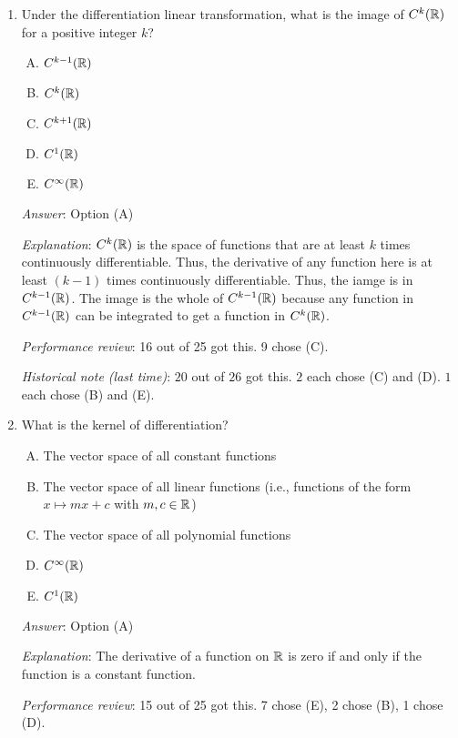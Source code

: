 \documentclass[10pt]{amsart}
\begin{document}
\begin{enumerate}
  {\em Historical note (last time)}: $18$ out of $26$ got this. $4$
  chose (A), $2$ each chose (B) and (E).


\item Under the differentiation linear transformation, what is the
  image of $C^k(\mathbb{R})$ for a positive integer $k$?

  \begin{enumerate}[(A)]
  \item $C^{k-1}(\mathbb{R})$
  \item $C^k(\mathbb{R})$
  \item $C^{k+1}(\mathbb{R})$
  \item $C^1(\mathbb{R})$
  \item $C^\infty(\mathbb{R})$
  \end{enumerate}

  {\em Answer}: Option (A)

  {\em Explanation}: $C^k(\mathbb{R})$ is the space of functions that are at
  least $k$ times continuously differentiable. Thus, the derivative of
  any function here is at least $(k - 1)$ times continuously
  differentiable. Thus, the iamge is in $C^{k-1}(\mathbb{R})$. The image is
  the whole of $C^{k-1}(\mathbb{R})$ because any function in $C^{k-1}(\mathbb{R})$ can
  be integrated to get a function in $C^k(\mathbb{R})$.

  {\em Performance review}: 16 out of 25 got this. 9 chose (C).

  {\em Historical note (last time)}: $20$ out of $26$ got this. $2$ each chose
  (C) and (D). $1$ each chose (B) and (E).

\item What is the kernel of differentiation?

  \begin{enumerate}[(A)]
  \item The vector space of all constant functions
  \item The vector space of all linear functions (i.e., functions of
    the form $x \mapsto mx + c$ with $m,c \in \mathbb{R}$)
  \item The vector space of all polynomial functions
  \item $C^\infty(\mathbb{R})$
  \item $C^1(\mathbb{R})$
  \end{enumerate}

  {\em Answer}: Option (A)

  {\em Explanation}: The derivative of a function on $\mathbb{R}$ is zero if
  and only if the function is a constant function.

  {\em Performance review}: 15 out of 25 got this. 7 chose (E), 2
  chose (B), 1 chose (D).


\end{enumerate}
\end{document}
